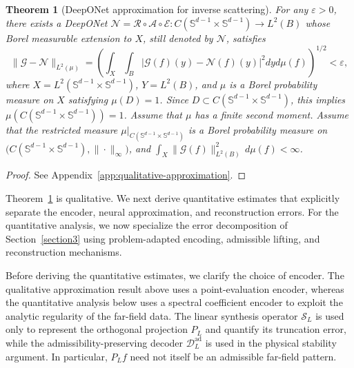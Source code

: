 \documentclass{article}
\numberwithin{equation}{section}
\theoremstyle{plain}
\newtheorem{theorem}{Theorem}[section]
\begin{document}
	\begin{theorem}[DeepONet approximation for inverse scattering]\label{thm:deeponet-inverse-scattering-approx}
		For any $\varepsilon > 0$, there exists a DeepONet $\mathscr{N} = \mathcal{R} \circ \mathcal{A} \circ \mathcal{E}: C(\mathbb{S}^{d-1} \times \mathbb{S}^{d-1}) \to L^2(B)$ whose Borel measurable extension to $X$, still denoted by $\mathscr N$, satisfies
		\begin{equation*}
			\| \mathscr{G} - \mathscr{N} \|_{L^2(\mu)} = \left( \int_X \int_B | \mathscr{G}(f)(y) - \mathscr{N}(f)(y) |^2  dy  d\mu(f) \right)^{1/2} < \varepsilon,
		\end{equation*}
		where $X = L^2(\mathbb{S}^{d-1} \times \mathbb{S}^{d-1})$, $Y = L^2(B)$, and $\mu$ is a Borel probability measure on $X$ satisfying $\mu(D)=1$. Since $D\subset C(\mathbb{S}^{d-1} \times \mathbb{S}^{d-1})$, this implies $\mu(C(\mathbb{S}^{d-1} \times \mathbb{S}^{d-1}))=1$. Assume that $\mu$ has a finite second moment. Assume that the restricted measure $\mu|_{C(\mathbb{S}^{d-1} \times \mathbb{S}^{d-1})}$ is a Borel probability measure on
		$\big(C(\mathbb{S}^{d-1} \times \mathbb{S}^{d-1}),\|\cdot\|_{\infty}\big)$, and $\int_X \|\mathscr G(f)\|_{L^2(B)}^2\,d\mu(f)<\infty$.
	\end{theorem}
	\begin{proof}
		See Appendix~\ref{app:qualitative-approximation}.
	\end{proof}
	
	Theorem~\ref{thm:deeponet-inverse-scattering-approx} is qualitative. We next derive quantitative estimates that explicitly separate the encoder, neural approximation, and reconstruction errors. For the quantitative analysis, we now specialize the error decomposition of Section~\ref{section3} using problem-adapted encoding, admissible lifting, and reconstruction mechanisms. 
	
	Before deriving the quantitative estimates, we clarify the choice of encoder. The qualitative approximation result above uses a point-evaluation encoder, whereas the quantitative analysis below uses a spectral coefficient encoder to exploit the analytic regularity of the far-field data. The linear synthesis operator $\mathcal S_L$ is used only to represent the orthogonal projection $P_L$ and quantify its truncation error, while the admissibility-preserving decoder $\mathcal D_L^{\mathrm{ad}}$ is used in the physical stability argument. In particular, $P_Lf$ need not itself be an admissible far-field pattern.
\end{document}
